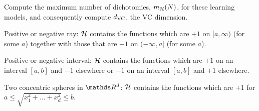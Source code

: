 \begin{enunciado}{3}
    Compute the maximum number of dichotomies, $m_{\mathcal{H}}(N)$, for these
    learning models, and consequently compute $d_{\text{VC}}$, the VC dimension.
    
     Positive or negative ray: $\mathcal{H}$ contains the functions
    which are $+1$ on $[a, \infty)$ (for some $a$) together with those
    that are $+1$ on $(-\infty, a]$ (for some $a$).
    
     Positive or negative interval: $\mathcal{H}$ contains the functions which are $+1$ on an interval $[a, b]$ and $-1$ elsewhere or $-1$ on an interval $[a, b]$ and $+1$ elsewhere.
    
     Two concentric spheres in $\conjR^d$: $\mathcal{H}$ contains the
    functions which are $+1$ for $a \le \sqrt{x_1^2 + \dots + x_d^2} \le b$.
\end{enunciado}


